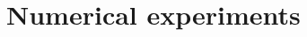 \documentclass{article}
\newcommand{\1}{\mathbf{1}}
\begin{document}



\section{Numerical experiments}\label{sec:XP}
\end{document}
